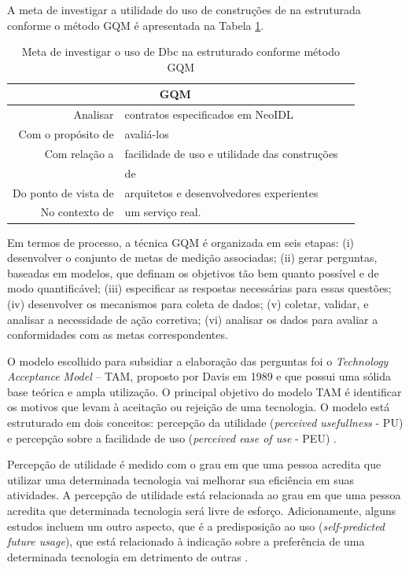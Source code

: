 A meta de investigar a utilidade do uso de construções de \designbycontract{} na
\neoidl{} estruturada conforme o método GQM é apresentada na Tabela
\ref{TabelaMetasGQM}.

\begin{table}[h]
\centering
\vspace{0.5cm}
\begin{tabular}{r|lr}
\multicolumn{2}{c}{GQM}\\
\hline    
Analisar & contratos especificados em NeoIDL \\
Com o propósito de  & avaliá-los \\
Com relação a & facilidade de uso e utilidade das construções \\
& de \designbycontract{} \\
Do ponto de vista de & arquitetos e desenvolvedores experientes \\
No contexto de & um serviço real.           
\end{tabular}
\caption{Meta de investigar o uso de Dbc na \neoidl{} estruturado conforme
método GQM}
\label{TabelaMetasGQM}
\end{table}

Em termos de processo, a técnica GQM é organizada em seis etapas: (i)
desenvolver o conjunto de metas de medição associadas; (ii) gerar perguntas,
baseadas em modelos, que definam os objetivos tão bem quanto possível e de modo
quantificável; (iii) especificar as respostas necessárias para essas questões;
(iv) desenvolver os mecanismos para coleta de dados; (v) coletar, validar, e analisar a necessidade de ação corretiva; (vi) analisar
os dados para avaliar a conformidades com as metas correspondentes.

O modelo escolhido para subsidiar a elaboração das perguntas foi o
\textit{Technology Acceptance Model} -- TAM, proposto por Davis em 1989
\cite{davis1989perceived} e que possui uma sólida base teórica e ampla
utilização.
O principal objetivo do modelo TAM é identificar os motivos que levam à aceitação
ou rejeição de uma tecnologia. O modelo está estruturado em dois conceitos:
percepção da utilidade (\textit{perceived usefullness} - PU) e percepção sobre a
facilidade de uso (\textit{perceived ease of use} - PEU)
\cite{hernandes2010avaliaccao}.

Percepção de utilidade é medido com o grau em que uma pessoa acredita que
utilizar uma determinada tecnologia vai melhorar sua eficiência em suas
atividades. A percepção de utilidade está relacionada ao grau em que uma pessoa
acredita que determinada tecnologia será livre de esforço. Adicionamente, alguns
estudos incluem um outro aspecto, que é a predisposição ao uso
(\textit{self-predicted future usage}), que está relacionado à indicação sobre a
preferência de uma determinada tecnologia em detrimento de outras \cite{laitenberger1998evaluating}.

